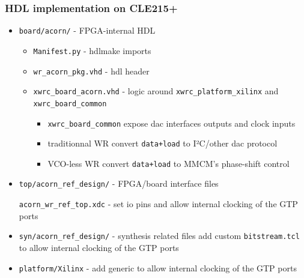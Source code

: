 \documentclass[compress,10pt,aspectratio=169]{beamer}
\begin{document}
\begin{frame}[fragile]\frametitle{HDL implementation on CLE215+}

  \begin{itemize}
    \item \texttt{board/acorn/} - FPGA-internal HDL
      \begin{itemize}
        \item \texttt{Manifest.py} - hdlmake imports
        \item \texttt{wr\_acorn\_pkg.vhd} - hdl header
        \item \texttt{xwrc\_board\_acorn.vhd} - logic around \texttt{xwrc\_platform\_xilinx} and \texttt{xwrc\_board\_common}
          \begin{itemize}
            \item \texttt{xwrc\_board\_common} expose dac interfaces outputs and clock inputs
            \item traditionnal WR convert \texttt{data+load} to I²C/other dac protocol
            \item VCO-less WR convert \texttt{data+load} to MMCM's phase-shift control
          \end{itemize}
      \end{itemize}
    \item \texttt{top/acorn\_ref\_design/} - FPGA/board interface files

          \texttt{acorn\_wr\_ref\_top.xdc} - set io pins and allow internal clocking of the GTP ports
    \item \texttt{syn/acorn\_ref\_design/} - synthesis related files
          add custom \texttt{bitstream.tcl} to allow internal clocking of the GTP ports
    \item \texttt{platform/Xilinx} - add generic to allow internal clocking of the GTP ports
  \end{itemize}

\end{frame}
\end{document}
